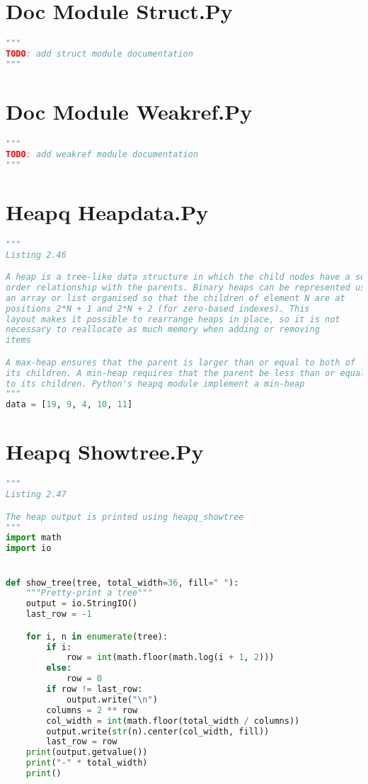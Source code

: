 \documentclass[a4paper,landscape]{report}
\begin{document}
\section{Doc Module Struct.Py}
\begin{lstlisting}[language=Python]
"""
TODO: add struct module documentation
"""
\end{lstlisting}
\section{Doc Module Weakref.Py}
\begin{lstlisting}[language=Python]
"""
TODO: add weakref module documentation
"""
\end{lstlisting}
\section{Heapq Heapdata.Py}
\begin{lstlisting}[language=Python]
"""
Listing 2.46

A heap is a tree-like data structure in which the child nodes have a sort-
order relationship with the parents. Binary heaps can be represented using
an array or list organised so that the children of element N are at
positions 2*N + 1 and 2*N + 2 (for zero-based indexes). This
layout makes it possible to rearrange heaps in place, so it is not
necessary to reallocate as much memory when adding or removing
items

A max-heap ensures that the parent is larger than or equal to both of
its children. A min-heap requires that the parent be less than or equal
to its children. Python's heapq module implement a min-heap
"""
data = [19, 9, 4, 10, 11]

\end{lstlisting}
\section{Heapq Showtree.Py}
\begin{lstlisting}[language=Python]
"""
Listing 2.47

The heap output is printed using heapq_showtree
"""
import math
import io


def show_tree(tree, total_width=36, fill=" "):
    """Pretty-print a tree"""
    output = io.StringIO()
    last_row = -1

    for i, n in enumerate(tree):
        if i:
            row = int(math.floor(math.log(i + 1, 2)))
        else:
            row = 0
        if row != last_row:
            output.write("\n")
        columns = 2 ** row
        col_width = int(math.floor(total_width / columns))
        output.write(str(n).center(col_width, fill))
        last_row = row
    print(output.getvalue())
    print("-" * total_width)
    print()

\end{lstlisting}
\end{document}
